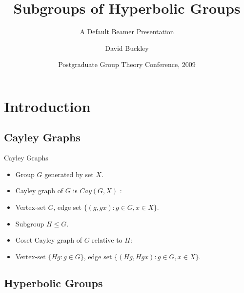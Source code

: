 \documentclass{beamer}
\title{Subgroups of Hyperbolic Groups}
\subtitle{A Default Beamer Presentation}
\author{David Buckley}
\institute[University of Warwick]{
  Mathematics Department\\
  University of Warwick
}
\date[PGTC 2009] %
{Postgraduate Group Theory Conference, 2009}
\begin{document}
\begin{frame}
  \titlepage
\end{frame}






\section{Introduction}

\subsection{Cayley Graphs}

\begin{frame}{Cayley Graphs}
	\begin{itemize}
		\item Group $G$ generated by set $X$.
		\item Cayley graph of $G$ is $Cay(G, X)$ \pause :
		\item Vertex-set $G$, edge set $\{(g, gx) : g \in G, x \in X\}$.
		\pause
		\item Subgroup $H \le G$.
		\item Coset Cayley graph of $G$ relative to $H$\pause:
		\item Vertex-set $\{Hg : g \in G\}$, edge set $\{(Hg, Hgx) : g \in G, x \in X\}$.
	\end{itemize}
\end{frame}

\subsection{Hyperbolic Groups}
\end{document}
